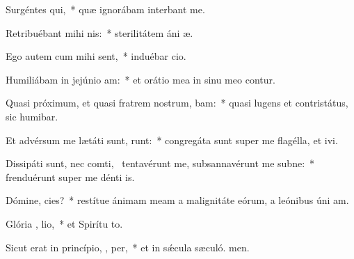 \item Surgéntes  qui,~* quæ ignorábam interbant me.
\item Retribuébant mihi   nis:~* sterilitátem áni æ.
\item Ego autem cum mihi  sent,~* induébar cio.
\item Humiliábam in jejúnio  am:~* et orátio mea in sinu meo contur.
\item Quasi próximum, et quasi fratrem nostrum,  bam:~* quasi lugens et contristátus, sic humibar.
\item Et advérsum me lætáti sunt,  runt:~* congregáta sunt super me flagélla, et ivi.
\item Dissipáti sunt, nec comti,~\pscross{} tentavérunt me, subsannavérunt me subne:~* frenduérunt super me dénti is.
\item Dómine,  cies?~* restítue ánimam meam a malignitáte eórum, a leónibus úni am.
\item Glória ,  lio,~* et Spirítu to.
\item Sicut erat in princípio,  ,  per,~* et in sǽcula sæculó. men.
